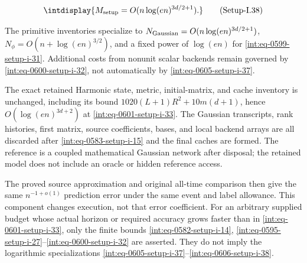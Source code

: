 \label{int:eq-setup-i-38}
\begingroup\renewcommand{\theHequation}{intdisplay.1125}
\begin{equation}
\intdisplay{
M_{\rm setup}=O(n\log(en)^{3d/2+1}).
}
\tag{Setup-I.38}
\label{int:eq-0606-setup-i-38}
\end{equation}
\endgroup


The primitive inventories specialize to \(N_{\rm Gaussian}=O(n\log(en)^{3d/2+1})\), \(N_\phi=O(n+\log(en)^{3/2})\), and a fixed power of \(\log(en)\) for \hyperref[int:eq-setup-i-31]{\eqref{int:eq-0599-setup-i-31}}. Additional costs from nonunit scalar backends remain governed by \hyperref[int:eq-setup-i-32]{\eqref{int:eq-0600-setup-i-32}}, not automatically by \hyperref[int:eq-setup-i-37]{\eqref{int:eq-0605-setup-i-37}}.



The exact retained Harmonic state, metric, initial-matrix, and cache inventory is unchanged, including its bound \(1020(L+1)R^2+10m(d+1)\), hence \(O(\log(en)^{3d+2})\) at \hyperref[int:eq-setup-i-33]{\eqref{int:eq-0601-setup-i-33}}. The Gaussian transcripts, rank histories, first matrix, source coefficients, bases, and local backend arrays are all discarded after \hyperref[int:eq-setup-i-15]{\eqref{int:eq-0583-setup-i-15}} and the final caches are formed. The reference is a coupled mathematical Gaussian network after disposal; the retained model does not include an oracle or hidden reference access.



The proved source approximation and original all-time comparison then give the same \(n^{-1+o(1)}\) prediction error under the same event and label allowance. This component changes execution, not that error coefficient. For an arbitrary supplied budget whose actual horizon or required accuracy grows faster than in \hyperref[int:eq-setup-i-33]{\eqref{int:eq-0601-setup-i-33}}, only the finite bounds \hyperref[int:eq-setup-i-14]{\eqref{int:eq-0582-setup-i-14}}, \hyperref[int:eq-setup-i-27]{\eqref{int:eq-0595-setup-i-27}}--\allowbreak \hyperref[int:eq-setup-i-32]{\eqref{int:eq-0600-setup-i-32}} are asserted. They do not imply the logarithmic specializations \hyperref[int:eq-setup-i-37]{\eqref{int:eq-0605-setup-i-37}}--\allowbreak \hyperref[int:eq-setup-i-38]{\eqref{int:eq-0606-setup-i-38}}.
